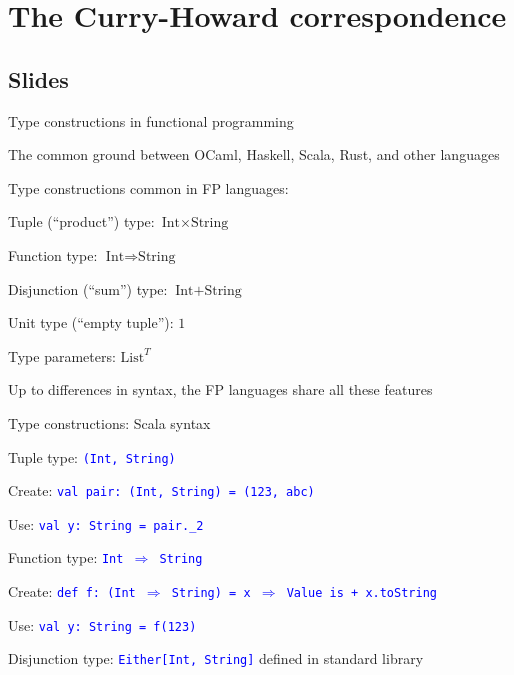 \chapter{The Curry-Howard correspondence\label{app:The-Curry-Howard-correspondence}}

\section{Slides}

Type constructions in functional programming

The common ground between OCaml, Haskell, Scala, Rust, and other languages

Type constructions common in FP languages:

Tuple (``product'') type: $\text{Int}\times\text{String}$

Function type: $\text{Int}\Rightarrow\text{String}$

Disjunction (``sum'') type: $\text{Int}+\text{String}$

Unit type (``empty tuple''): $1$

Type parameters: $\text{List}^{T}$

Up to differences in syntax, the FP languages share all these features

Type constructions: Scala syntax

Tuple type: \texttt{\textcolor{blue}{\footnotesize{}(Int, String)}}{\footnotesize\par}

Create: \texttt{\textcolor{blue}{\footnotesize{}val pair:\ (Int,
String) = (123, \textquotedbl abc\textquotedbl )}} 

Use: \texttt{\textcolor{blue}{\footnotesize{}val y:\ String = pair.\_2}}{\footnotesize\par}

Function type: \texttt{\textcolor{blue}{\footnotesize{}Int $\Rightarrow$
String}}{\footnotesize\par}

Create: \texttt{\textcolor{blue}{\footnotesize{}def f:\ (Int $\Rightarrow$
String) = x $\Rightarrow$ \textquotedbl Value is \textquotedbl{}
+ x.toString}} 

Use: \texttt{\textcolor{blue}{\footnotesize{}val y:\ String = f(123)}}{\footnotesize\par}

Disjunction type: \texttt{\textcolor{blue}{\footnotesize{}Either{[}Int,
String{]}}} defined in standard library

